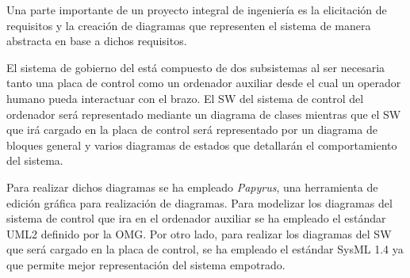 Una parte importante de un proyecto integral de ingeniería es la elicitación de requisitos y la creación de diagramas que representen el sistema de manera abstracta en base a dichos requisitos.

El sistema de gobierno del \pArm{} está compuesto de dos subsistemas al ser necesaria tanto una placa de control como un ordenador auxiliar desde el cual un operador humano pueda interactuar con el brazo. El \ac{SW} del sistema de control del ordenador será representado mediante un diagrama de clases mientras que el \ac{SW} que irá cargado en la placa de control será representado por un diagrama de bloques general y varios diagramas de estados que detallarán el comportamiento del sistema.

Para realizar dichos diagramas se ha empleado \textit{Papyrus}, una herramienta de edición gráfica para realización de diagramas. Para modelizar los diagramas del sistema de control que ira en el ordenador auxiliar se ha empleado el estándar UML2 definido por la OMG. Por otro lado, para realizar los diagramas del \ac{SW} que será cargado en la placa de control, se ha empleado el estándar SysML 1.4 ya que permite mejor representación del sistema empotrado.

